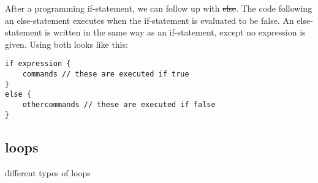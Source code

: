 After a programming if-statement,
we can follow up with \st{else}.
The code following an else-statement executes when the if-statement is evaluated to be false.
An else-statement is written in the same way as an if-statement, except no expression is given.
Using both looks like this:
\begin{verbatim}
if expression {
    commands // these are executed if true
}
else {
    othercommands // these are executed if false
}
\end{verbatim}

\subsection{loops}

different types of loops
